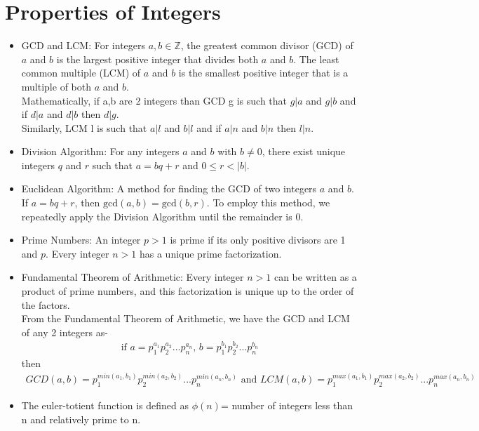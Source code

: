 \documentclass[12pt,a4paper,oneside]{report}
\theoremstyle{definition}
\begin{document}
\section{Properties of Integers}
\begin{itemize}
  \item GCD and LCM: For integers $a, b \in \mathbb{Z}$, the greatest common divisor (GCD) of $a$ and $b$ is the largest positive integer that divides both $a$ and $b$. The least common multiple (LCM) of $a$ and $b$ is the smallest positive integer that is a multiple of both $a$ and $b$.
  \\Mathematically, if a,b are 2 integers than GCD g is such that $g|a$ and $g|b$ and if $d|a$ and $d|b$ then $d|g$.  
  \\Similarly, LCM l is such that $a|l$ and $b|l$ and if $a|n$ and $b|n$ then $l|n$.
  \item Division Algorithm: For any integers $a$ and $b$ with $b \neq 0$, there exist unique integers $q$ and $r$ such that $a = bq + r$ and $0 \leq r < |b|$.
  \item Euclidean Algorithm: A method for finding the GCD of two integers $a$ and $b$. If $a = bq + r$, then $\text{gcd}(a, b) = \text{gcd}(b, r)$. To employ this method, we repeatedly apply the Division Algorithm until the remainder is 0.
  \item Prime Numbers: An integer $p > 1$ is prime if its only positive divisors are 1 and $p$. Every integer $n > 1$ has a unique prime factorization.
  \item Fundamental Theorem of Arithmetic: Every integer $n > 1$ can be written as a product of prime numbers, and this factorization is unique up to the order of the factors.
\\ From the Fundamental Theorem of Arithmetic, we have the GCD and LCM of any 2 integers as-
    \begin{align*}
      \text{if } a= p_1^{a_1}p_2^{a_2}...p_n^{a_n} \text{, }b= p_1^{b_1}p_2^{b_2}...p_n^{b_n}
    \end{align*}
   then 
    \begin{align*}
  GCD(a,b)=p_1^{min(a_1,b_1)}p_2^{min(a_2,b_2)}...p_n^{min(a_n,b_n)} \text{ and } LCM(a,b)=p_1^{max(a_1,b_1)}p_2^{max(a_2,b_2)}...p_n^{max(a_n,b_n)} 
    \end{align*}
  \item The euler-totient function is defined as $\phi(n)$= number of integers less than n and relatively prime to n.
  \end{itemize}
\end{document}
